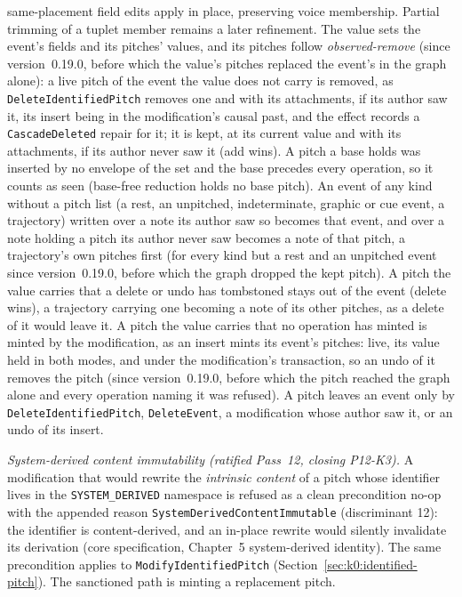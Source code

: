 \documentclass[11pt,letterpaper]{report}
\begin{document}
same-placement field edits apply in place, preserving voice membership. Partial
trimming of a tuplet member remains a later refinement. The value sets the
event's fields and its pitches' values, and its pitches follow
\emph{observed-remove} (since version~0.19.0, before which the value's pitches
replaced the event's in the graph alone): a live pitch of the event the value
does not carry is removed, as \texttt{DeleteIdentifiedPitch} removes one and
with its attachments, if its author saw it, its insert being in the
modification's causal past, and the effect records a \texttt{CascadeDeleted}
repair for it; it is kept, at its current value and with its attachments, if
its author never saw it (add wins). A pitch a base holds was inserted by no
envelope of the set and the base precedes every operation, so it counts as
seen (base-free reduction holds no base pitch). An event of any kind without
a pitch list (a rest, an unpitched, indeterminate, graphic or cue event, a
trajectory) written over a note its author saw so becomes that event, and
over a note holding a pitch its author never saw becomes a note of that pitch,
a trajectory's own pitches first (for every kind but a rest and an unpitched
event since version~0.19.0, before which the graph dropped the kept pitch). A pitch the
value carries that a delete or undo has tombstoned stays out of the event
(delete wins), a trajectory carrying one becoming a note of its other pitches,
as a delete of it would leave it. A pitch the value carries that no operation has minted is
minted by the modification, as an insert mints its event's pitches: live, its
value held in both modes, and under the modification's transaction, so an
undo of it removes the pitch (since version~0.19.0, before which the pitch
reached the graph alone and every operation naming it was refused). A pitch leaves an event only by \texttt{DeleteIdentifiedPitch},
\texttt{DeleteEvent}, a modification whose author saw it, or an undo of its
insert.

\emph{System-derived content immutability (ratified Pass~12, closing
P12-K3).} A modification that would rewrite the \emph{intrinsic content} of a
pitch whose identifier lives in the \texttt{SYSTEM\_DERIVED} namespace is
refused as a clean precondition no-op with the appended reason
\texttt{SystemDerivedContentImmutable} (discriminant 12): the identifier is
content-derived, and an in-place rewrite would silently invalidate its
derivation (core specification, Chapter~5 system-derived identity). The same
precondition applies to \texttt{ModifyIdentifiedPitch}
(Section~\ref{sec:k0:identified-pitch}). The sanctioned path is minting a
replacement pitch.
\end{document}
